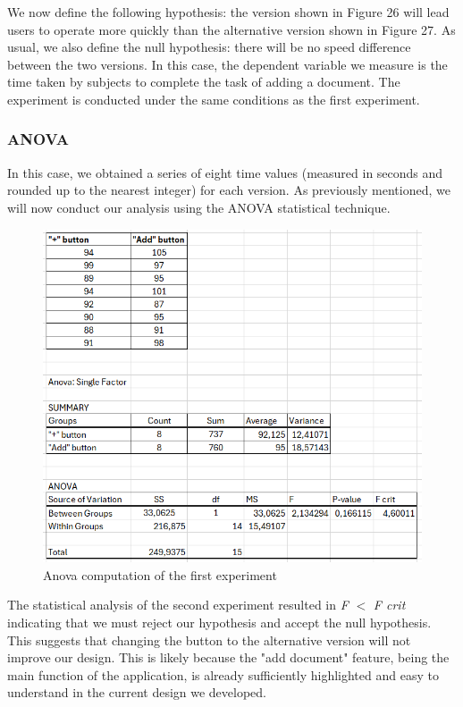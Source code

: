 			\noindent
			We now define the following hypothesis: the version shown in Figure 26 will lead users to operate more quickly than the alternative version shown in Figure 27. As usual, we also define the null hypothesis: there will be no speed difference between the two versions. In this case, the dependent variable we measure is the time taken by subjects to complete the task of adding a document. The experiment is conducted under the same conditions as the first experiment.\\
			\clearpage
		\subsubsection{ANOVA}
			In this case, we obtained a series of eight time values (measured in seconds and rounded up to the nearest integer) for each version. As previously mentioned, we will now conduct our analysis using the ANOVA statistical technique.
			\begin{figure}[htbp]
				\centering
				\includegraphics[width=1\textwidth]{../Draw.io diagrams/anova_+_add.png}  %
				\caption{Anova computation of the first experiment}
			\end{figure}
			
			\noindent
			The statistical analysis of the second experiment resulted in \textit{F} \(<\) \textit{F crit} indicating that we must reject our hypothesis and accept the null hypothesis. This suggests that changing the button to the alternative version will not improve our design. This is likely because the "add document" feature, being the main function of the application, is already sufficiently highlighted and easy to understand in the current design we developed.
			\clearpage
